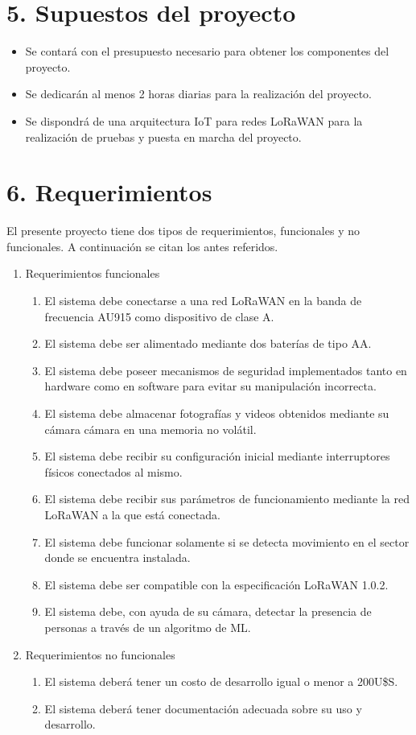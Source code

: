 \documentclass[
11pt, %
]{plan}
\begin{document}
\section{5. Supuestos del proyecto}
\label{sec:supuestos}

\begin{itemize}
	\item Se contará con el presupuesto necesario para obtener los componentes del proyecto.
	\item Se dedicarán al menos 2 horas diarias para la realización del proyecto.
	\item Se dispondrá de una arquitectura IoT para redes LoRaWAN para la realización de pruebas y puesta en marcha del proyecto.
\end{itemize}

\section{6. Requerimientos}
\label{sec:requerimientos}

El presente proyecto tiene dos tipos de requerimientos, funcionales y no funcionales. A continuación se citan los antes referidos.

\begin{enumerate}
	\item Requerimientos funcionales
		\begin{enumerate}
			\item El sistema debe conectarse a una red LoRaWAN en la banda de frecuencia AU915 como dispositivo de clase A.
			\item El sistema debe ser alimentado mediante dos baterías de tipo AA.
			\item El sistema debe poseer mecanismos de seguridad implementados tanto en hardware como en software para evitar su manipulación incorrecta.
			\item El sistema debe almacenar fotografías y videos obtenidos mediante su cámara cámara en una memoria no volátil.
			\item El sistema debe recibir su configuración inicial mediante interruptores físicos conectados al mismo.
			\item El sistema debe recibir sus parámetros de funcionamiento mediante la red LoRaWAN a la que está conectada.
			\item El sistema debe funcionar solamente si se detecta movimiento en el sector donde se encuentra instalada.
			\item El sistema debe ser compatible con la especificación LoRaWAN 1.0.2.
			\item El sistema debe, con ayuda de su cámara, detectar la presencia de personas a través de un algoritmo de ML.
		\end{enumerate}
	\item Requerimientos no funcionales
		\begin{enumerate}
			\item El sistema deberá tener un costo de desarrollo igual o menor a 200U\$S.
			\item El sistema deberá tener documentación adecuada sobre su uso y desarrollo.
		\end{enumerate}
\end{enumerate}
\end{document}

